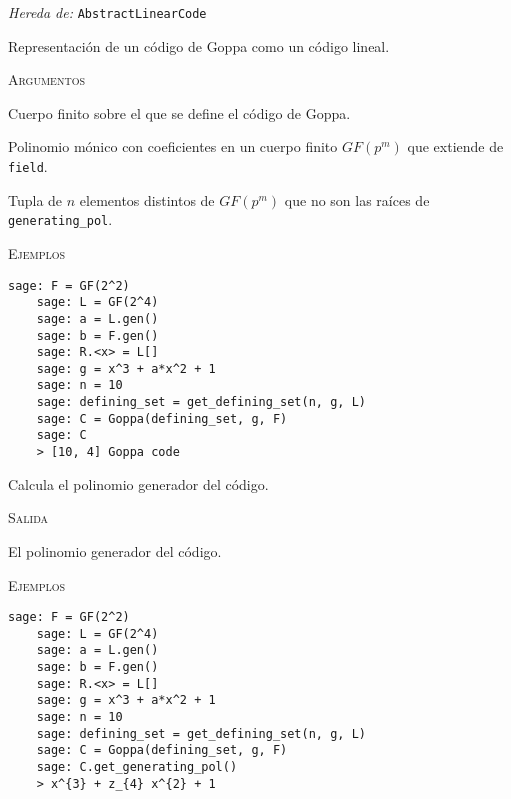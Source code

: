 \begin{description}[leftmargin=1em, font=\normalfont\ttfamily, style=nextline]
  \item[class Goppa(self, defining\_set, generating\_pol, field)]

  \emph{Hereda de:} \texttt{AbstractLinearCode}

Representación de un código de Goppa como un código lineal.

\textsc{Argumentos}
\begin{description}[font=\normalfont\ttfamily]
  \item[field] Cuerpo finito sobre el que se define el código de Goppa.
  \item[generating\_pol] Polinomio mónico con coeficientes en un cuerpo finito $GF(p^m)$ que extiende de \texttt{field}.
  \item[defining\_set] Tupla de $n$ elementos distintos de $GF(p^m)$ que no son las raíces de \texttt{generating\_pol}.
\end{description}

\textsc{Ejemplos}
  \begin{lstlisting}[gobble=4]
    sage: F = GF(2^2)
    sage: L = GF(2^4)
    sage: a = L.gen()
    sage: b = F.gen()
    sage: R.<x> = L[]
    sage: g = x^3 + a*x^2 + 1
    sage: n = 10
    sage: defining_set = get_defining_set(n, g, L)
    sage: C = Goppa(defining_set, g, F)
    sage: C
    > [10, 4] Goppa code
  \end{lstlisting}

\begin{description}[font=\ttfamily, style=nextline]
  \item[get\_generating\_pol(self)] Calcula el polinomio generador del código.
  
  \textsc{Salida}
  \begin{description}[font=\normalfont\ttfamily]
    \item[] El polinomio generador del código.
  \end{description}

  \textsc{Ejemplos}
  \begin{lstlisting}[gobble=4]
    sage: F = GF(2^2)
    sage: L = GF(2^4)
    sage: a = L.gen()
    sage: b = F.gen()
    sage: R.<x> = L[]
    sage: g = x^3 + a*x^2 + 1
    sage: n = 10
    sage: defining_set = get_defining_set(n, g, L)
    sage: C = Goppa(defining_set, g, F)
    sage: C.get_generating_pol()
    > x^{3} + z_{4} x^{2} + 1
  \end{lstlisting}


\end{description}
\end{description}
